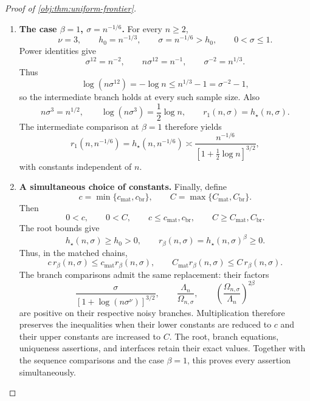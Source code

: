 \documentclass[11pt]{article}
\begin{document}
\begin{proof}[Proof of \cref{obj:thm:uniform-frontier}]
\begin{enumerate}
\item \textbf{The case \(\beta=1\), \(\sigma=n^{-1/6}\).}
For every \(n\ge2\),
\[
\nu=3,\qquad h_0=n^{-1/3},\qquad
\sigma=n^{-1/6}>h_0,\qquad 0<\sigma\le1.
\]
Power identities give
\[
\sigma^{12}=n^{-2},\qquad
n\sigma^{12}=n^{-1},\qquad
\sigma^{-2}=n^{1/3}.
\]
Thus
\[
\log(n\sigma^{12})=-\log n
\le n^{1/3}-1=\sigma^{-2}-1,
\]
so the intermediate branch holds at every such sample size. Also
\[
n\sigma^3=n^{1/2},
\qquad
\log(n\sigma^3)=\frac12\log n,
\qquad
r_1(n,\sigma)=h_\star(n,\sigma).
\]
The intermediate comparison at \(\beta=1\) therefore yields
\[
r_1(n,n^{-1/6})
=h_\star(n,n^{-1/6})
\asymp
\frac{n^{-1/6}}{[1+\tfrac12\log n]^{3/2}},
\]
with constants independent of \(n\).

\item \textbf{A simultaneous choice of constants.}
Finally, define
\[
c=\min\{c_{\mathrm{mat}},c_{\mathrm{br}}\},
\qquad
C=\max\{C_{\mathrm{mat}},C_{\mathrm{br}}\}.
\]
Then
\[
0<c,\qquad 0<C,\qquad
c\le c_{\mathrm{mat}},c_{\mathrm{br}},
\qquad
C\ge C_{\mathrm{mat}},C_{\mathrm{br}}.
\]
The root bounds give
\[
h_\star(n,\sigma)\ge h_0>0,
\qquad
r_\beta(n,\sigma)=h_\star(n,\sigma)^\beta\ge0.
\]
Thus, in the matched chains,
\[
c\,r_\beta(n,\sigma)
\le c_{\mathrm{mat}}r_\beta(n,\sigma),
\qquad
C_{\mathrm{mat}}r_\beta(n,\sigma)
\le C\,r_\beta(n,\sigma).
\]
The branch comparisons admit the same replacement: their factors
\[
\frac{\sigma}{[1+\log(n\sigma^\nu)]^{3/2}},
\qquad
\frac{\Lambda_n}{\Omega_{n,\sigma}},
\qquad
\left(\frac{\Omega_{n,\sigma}}{\Lambda_n}\right)^{2\beta}
\]
are positive on their respective noisy branches. Multiplication therefore
preserves the inequalities when their lower constants are reduced to \(c\)
and their upper constants are increased to \(C\). The root, branch equations,
uniqueness assertions, and interfaces retain their exact values. Together
with the sequence comparisons and the case \(\beta=1\), this proves every
assertion simultaneously.
\end{enumerate}
\end{proof}
\end{document}
